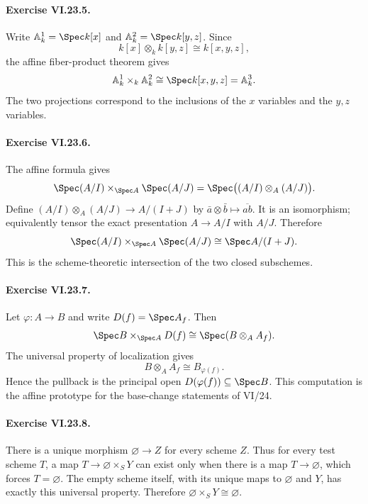 \paragraph{Exercise VI.23.5.}
\begin{solution}
Write $\mathbb A^1_k=\Spec k[x]$ and $\mathbb A^2_k=\Spec k[y,z]$.  Since
\[
k[x]\otimes_k k[y,z]\cong k[x,y,z],
\]
the affine fiber-product theorem gives
\[
\mathbb A^1_k\times_k\mathbb A^2_k
\cong\Spec k[x,y,z]=\mathbb A^3_k.
\]
The two projections correspond to the inclusions of the $x$ variables and the $y,z$ variables.
\end{solution}

\paragraph{Exercise VI.23.6.}
\begin{solution}
The affine formula gives
\[
\Spec(A/I)\times_{\Spec A}\Spec(A/J)
=\Spec\bigl((A/I)\otimes_A(A/J)\bigr).
\]
Define $(A/I)\otimes_A(A/J)\to A/(I+J)$ by
$\bar a\otimes\bar b\mapsto\overline{ab}$.  It is an isomorphism; equivalently tensor the exact
presentation $A\to A/I$ with $A/J$.  Therefore
\[
\Spec(A/I)\times_{\Spec A}\Spec(A/J)\cong\Spec A/(I+J).
\]
This is the scheme-theoretic intersection of the two closed subschemes.
\end{solution}

\paragraph{Exercise VI.23.7.}
\begin{solution}
Let $\varphi:A\to B$ and write $D(f)=\Spec A_f$.  Then
\[
\Spec B\times_{\Spec A}D(f)
\cong\Spec(B\otimes_AA_f).
\]
The universal property of localization gives
\[
B\otimes_AA_f\cong B_{\varphi(f)}.
\]
Hence the pullback is the principal open
$D(\varphi(f))\subseteq\Spec B$.  This computation is the affine prototype for the base-change
statements of VI/24.
\end{solution}

\paragraph{Exercise VI.23.8.}
\begin{solution}
There is a unique morphism $\varnothing\to Z$ for every scheme $Z$.  Thus for every test scheme
$T$, a map $T\to\varnothing\times_SY$ can exist only when there is a map $T\to\varnothing$,
which forces $T=\varnothing$.  The empty scheme itself, with its unique maps to $\varnothing$ and
$Y$, has exactly this universal property.  Therefore
$\varnothing\times_SY\cong\varnothing$.
\end{solution}

